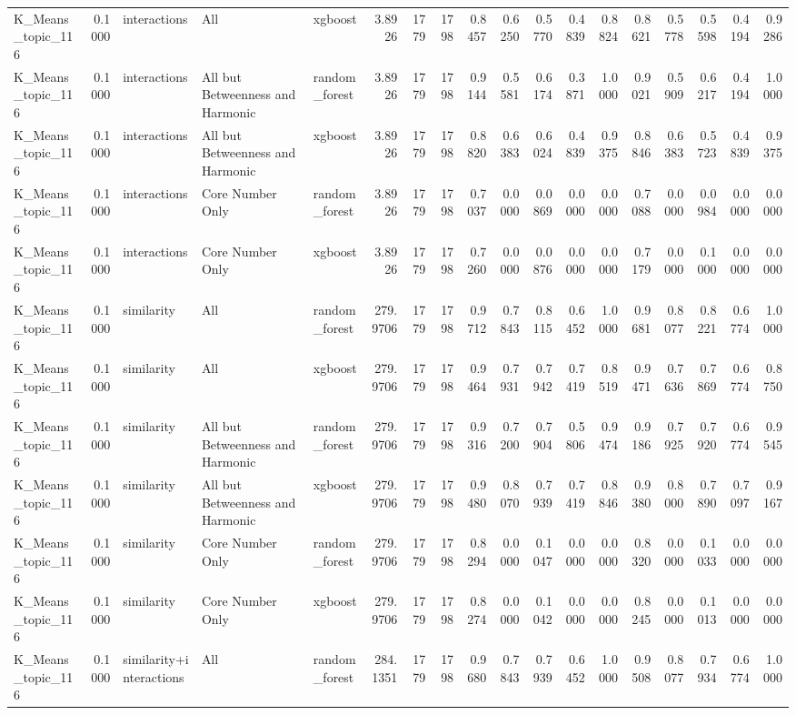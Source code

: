 \begin{tabular}{lrlllrrrrrrrrrrrrr}
K_Means_topic_116 & 0.1000 & interactions & All & xgboost & 3.8926 & 1779 & 1798 & 0.8457 & 0.6250 & 0.5770 & 0.4839 & 0.8824 & 0.8621 & 0.5778 & 0.5598 & 0.4194 & 0.9286 \\
K_Means_topic_116 & 0.1000 & interactions & All but Betweenness and Harmonic & random_forest & 3.8926 & 1779 & 1798 & 0.9144 & 0.5581 & 0.6174 & 0.3871 & 1.0000 & 0.9021 & 0.5909 & 0.6217 & 0.4194 & 1.0000 \\
K_Means_topic_116 & 0.1000 & interactions & All but Betweenness and Harmonic & xgboost & 3.8926 & 1779 & 1798 & 0.8820 & 0.6383 & 0.6024 & 0.4839 & 0.9375 & 0.8846 & 0.6383 & 0.5723 & 0.4839 & 0.9375 \\
K_Means_topic_116 & 0.1000 & interactions & Core Number Only & random_forest & 3.8926 & 1779 & 1798 & 0.7037 & 0.0000 & 0.0869 & 0.0000 & 0.0000 & 0.7088 & 0.0000 & 0.0984 & 0.0000 & 0.0000 \\
K_Means_topic_116 & 0.1000 & interactions & Core Number Only & xgboost & 3.8926 & 1779 & 1798 & 0.7260 & 0.0000 & 0.0876 & 0.0000 & 0.0000 & 0.7179 & 0.0000 & 0.1000 & 0.0000 & 0.0000 \\
K_Means_topic_116 & 0.1000 & similarity & All & random_forest & 279.9706 & 1779 & 1798 & 0.9712 & 0.7843 & 0.8115 & 0.6452 & 1.0000 & 0.9681 & 0.8077 & 0.8221 & 0.6774 & 1.0000 \\
K_Means_topic_116 & 0.1000 & similarity & All & xgboost & 279.9706 & 1779 & 1798 & 0.9464 & 0.7931 & 0.7942 & 0.7419 & 0.8519 & 0.9471 & 0.7636 & 0.7869 & 0.6774 & 0.8750 \\
K_Means_topic_116 & 0.1000 & similarity & All but Betweenness and Harmonic & random_forest & 279.9706 & 1779 & 1798 & 0.9316 & 0.7200 & 0.7904 & 0.5806 & 0.9474 & 0.9186 & 0.7925 & 0.7920 & 0.6774 & 0.9545 \\
K_Means_topic_116 & 0.1000 & similarity & All but Betweenness and Harmonic & xgboost & 279.9706 & 1779 & 1798 & 0.9480 & 0.8070 & 0.7939 & 0.7419 & 0.8846 & 0.9380 & 0.8000 & 0.7890 & 0.7097 & 0.9167 \\
K_Means_topic_116 & 0.1000 & similarity & Core Number Only & random_forest & 279.9706 & 1779 & 1798 & 0.8294 & 0.0000 & 0.1047 & 0.0000 & 0.0000 & 0.8320 & 0.0000 & 0.1033 & 0.0000 & 0.0000 \\
K_Means_topic_116 & 0.1000 & similarity & Core Number Only & xgboost & 279.9706 & 1779 & 1798 & 0.8274 & 0.0000 & 0.1042 & 0.0000 & 0.0000 & 0.8245 & 0.0000 & 0.1013 & 0.0000 & 0.0000 \\
K_Means_topic_116 & 0.1000 & similarity+interactions & All & random_forest & 284.1351 & 1779 & 1798 & 0.9680 & 0.7843 & 0.7939 & 0.6452 & 1.0000 & 0.9508 & 0.8077 & 0.7934 & 0.6774 & 1.0000 \\

\end{tabular}
